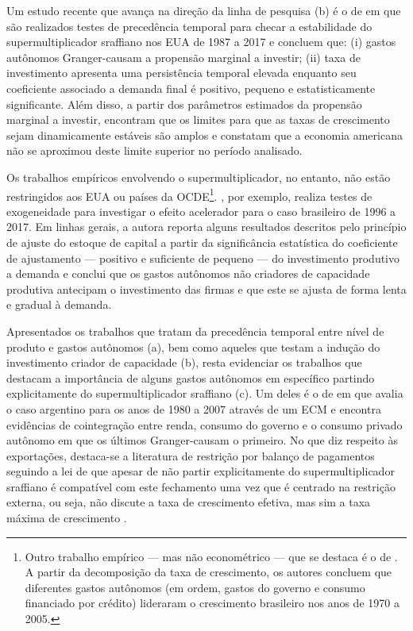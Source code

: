 Um estudo recente que avança na direção da linha de pesquisa (b) é o de \textcite{haluska_growth_2019} em que são realizados testes de precedência temporal para checar a estabilidade do supermultiplicador sraffiano nos EUA de 1987 a 2017 e concluem que: (i) gastos autônomos Granger-causam a propensão marginal a investir; (ii) taxa de investimento apresenta uma persistência temporal elevada enquanto seu coeficiente associado a demanda final é positivo, pequeno e estatisticamente significante. 
Além disso, a partir dos parâmetros estimados da propensão marginal a investir, encontram que os limites para que as taxas de crescimento sejam dinamicamente estáveis são amplos e constatam que a economia americana não se aproximou deste limite superior no período analisado.


Os trabalhos empíricos envolvendo o supermultiplicador, no entanto, não estão restringidos aos EUA ou países da OCDE\footnote{Outro trabalho empírico --- mas não econométrico --- que se destaca é o de \textcite{freitas_pattern_2013}.
	A partir da decomposição da taxa de crescimento, os autores concluem que diferentes gastos autônomos (em ordem, gastos do governo e consumo financiado por crédito) lideraram o crescimento brasileiro nos anos de 1970 a 2005.
}.  
\textcite{braga_investment_2018}, por exemplo, realiza testes de exogeneidade para investigar o efeito acelerador para o caso brasileiro de 1996 a 2017.
Em linhas gerais, a autora reporta alguns resultados descritos pelo princípio de ajuste do estoque de capital a partir da significância estatística do coeficiente de ajustamento --- positivo e suficiente de pequeno --- do investimento produtivo a demanda e conclui que os gastos autônomos não criadores de capacidade produtiva antecipam o investimento das firmas e que este se ajusta de forma lenta e gradual à demanda.

Apresentados os trabalhos que tratam da precedência temporal entre nível de produto e gastos autônomos (a), bem como aqueles que testam a indução do investimento criador de capacidade (b), resta evidenciar os trabalhos que destacam a importância de alguns gastos autônomos em específico partindo explicitamente do supermultiplicador sraffiano (c). 
Um deles é o de \textcite{medici_cointegration_2011} em que avalia o caso argentino para os anos de 1980 a 2007 através de um ECM e encontra evidências de cointegração entre renda, consumo do governo e o consumo privado autônomo em que os últimos Granger-causam o primeiro. 
No que diz respeito às exportações, destaca-se a literatura de restrição por balanço de pagamentos seguindo a lei de \textcite{mccombie_balance--payments_1994} que apesar de não partir explicitamente do supermultiplicador sraffiano é compatível com este fechamento uma vez que é centrado na restrição externa, ou seja, não discute a taxa de crescimento efetiva, mas sim a taxa máxima de crescimento \cite{bhering_thirlwall_2019}.


